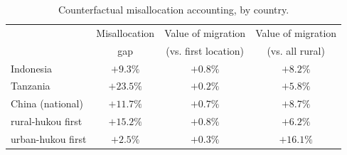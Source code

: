 \begin{table}[htbp]
\centering
\caption{Counterfactual misallocation accounting, by country.}
\label{tab:counterfactual_misallocation}
\begin{tabular}{lccc}
\toprule
 & Misallocation & Value of migration & Value of migration \\
 & gap & (vs. first location) & (vs. all rural) \\
\midrule
Indonesia & $+9.3\%$ & $+0.8\%$ & $+8.2\%$ \\
Tanzania & $+23.5\%$ & $+0.2\%$ & $+5.8\%$ \\
China (national) & $+11.7\%$ & $+0.7\%$ & $+8.7\%$ \\
\quad rural-hukou first & $+15.2\%$ & $+0.8\%$ & $+6.2\%$ \\
\quad urban-hukou first & $+2.5\%$ & $+0.3\%$ & $+16.1\%$ \\
\bottomrule
\end{tabular}
\par{}
\end{table}
